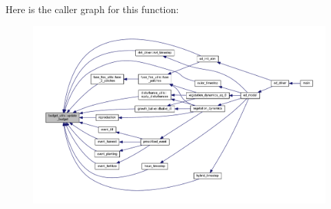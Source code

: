 Here is the caller graph for this function\+:\nopagebreak
\begin{figure}[H]
\begin{center}
\leavevmode
\includegraphics[width=350pt]{namespacebudget__utils_ad8835ee763cd964432b44e0a3d00e3da_icgraph}
\end{center}
\end{figure}


